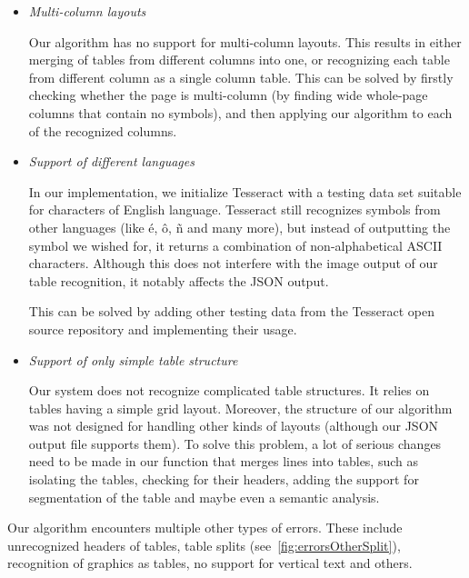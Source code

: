 \begin{itemize}
    \item \emph{Multi-column layouts}
    
    Our algorithm has no support for multi-column layouts. This results in either merging of tables from different columns into one, or recognizing each table from different column as a single column table. This can be solved by firstly checking whether the page is multi-column (by finding wide whole-page columns that contain no symbols), and then applying our algorithm to each of the recognized columns.
    
    \item \emph{Support of different languages}
    
    In our implementation, we initialize Tesseract with a testing data set suitable for characters of English language. Tesseract still recognizes symbols from other languages (like é, ô, ñ and many more), but instead of outputting the symbol we wished for, it returns a combination of non-alphabetical ASCII characters. Although this does not interfere with the image output of our table recognition, it notably affects the JSON output.
    
    This can be solved by adding other testing data from the Tesseract open source repository and implementing their usage.
    
    \item \emph{Support of only simple table structure}
    
    Our system does not recognize complicated table structures. It relies on tables having a simple grid layout. Moreover, the structure of our algorithm was not designed for handling other kinds of layouts (although our JSON output file supports them). To solve this problem, a lot of serious changes need to be made in our function that merges lines into tables, such as isolating the tables, checking for their headers, adding the support for segmentation of the table and maybe even a semantic analysis.
    
\end{itemize}

Our algorithm encounters multiple other types of errors. These include unrecognized headers of tables, table splits (see~\cref{fig:errorsOtherSplit}), recognition of graphics as tables, no support for vertical text and others.
    

